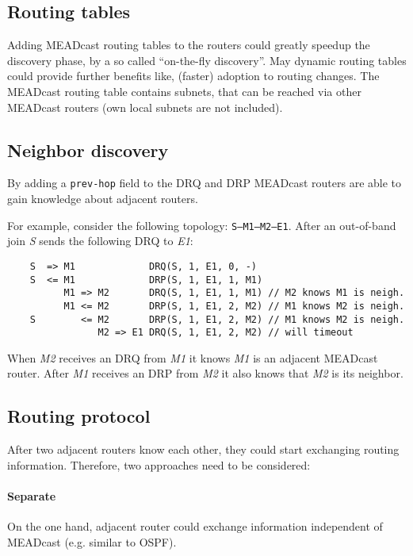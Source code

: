 \subsection{Routing tables} %
\label{sub:Routing tables}
Adding MEADcast routing tables to the routers could greatly speedup the 
discovery phase, by a so called ``on-the-fly discovery''.
May dynamic routing tables could provide further benefits like, (faster)
adoption to routing changes.
The MEADcast routing table contains subnets, that can be reached via other
MEADcast routers (own local subnets are not included).


\subsection{Neighbor discovery} %
\label{sub:Routing protocol}
By adding a \texttt{prev-hop} field to the DRQ and DRP MEADcast routers are able
to gain knowledge about adjacent routers.

For example, consider the following topology: \texttt{S--M1--M2--E1}.
After an out-of-band join \textit{S} sends the following DRQ to \textit{E1}:

\begin{lstlisting}
    S  => M1             DRQ(S, 1, E1, 0, -)
    S  <= M1             DRP(S, 1, E1, 1, M1)
          M1 => M2       DRQ(S, 1, E1, 1, M1) // M2 knows M1 is neigh.
          M1 <= M2       DRP(S, 1, E1, 2, M2) // M1 knows M2 is neigh.
    S        <= M2       DRP(S, 1, E1, 2, M2) // M1 knows M2 is neigh.
                M2 => E1 DRQ(S, 1, E1, 2, M2) // will timeout
\end{lstlisting}

When \textit{M2} receives an DRQ from \textit{M1} it knows \textit{M1} is an
adjacent MEADcast router.
After \textit{M1} receives an DRP from \textit{M2} it also knows that
\textit{M2} is its neighbor.


\subsection{Routing protocol} %
\label{sub:Routing protocol}
After two adjacent routers know each other, they could start exchanging routing
information.
Therefore, two approaches need to be considered:

\paragraph{Separate} %
\label{par:Separate}
On the one hand, adjacent router could exchange information independent of
MEADcast (e.g. similar to OSPF).

